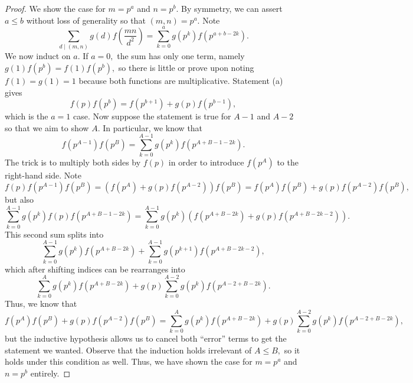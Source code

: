 \begin{proof}
We show the case for $m=p^a$ and $n=p^b.$ By symmetry, we can assert $a\le b$ without loss of generality so that $(m,n)=p^a.$ Note
\[\sum_{d\mid(m,n)}g(d)f\left(\frac{mn}{d^2}\right)=\sum_{k=0}^ag\left(p^k\right)f\left(p^{a+b-2k}\right).\]
We now induct on $a.$ If $a=0,$ the sum has only one term, namely $g(1)f\left(p^b\right)=f(1)f\left(p^b\right),$ so there is little or prove upon noting $f(1)=g(1)=1$ because both functions are multiplicative. Statement (a) gives
\[f(p)f\left(p^b\right)=f\left(p^{b+1}\right)+g(p)f\left(p^{b-1}\right),\]
which is the $a=1$ case. Now suppose the statement is true for $A-1$ and $A-2$ so that we aim to show $A.$ In particular, we know that
\[f\left(p^{A-1}\right)f\left(p^B\right)=\sum_{k=0}^{A-1}g\left(p^k\right)f\left(p^{A+B-1-2k}\right).\]
The trick is to multiply both sides by $f(p)$ in order to introduce $f\left(p^A\right)$ to the right-hand side. Note
\[f(p)f\left(p^{A-1}\right)f\left(p^B\right)=\left(f\left(p^A\right)+g(p)f\left(p^{A-2}\right)\right)f\left(p^B\right)=f\left(p^A\right)f\left(p^B\right)+g(p)f\left(p^{A-2}\right)f\left(p^B\right),\]
but also
\[\sum_{k=0}^{A-1}g\left(p^k\right)f(p)f\left(p^{A+B-1-2k}\right)=\sum_{k=0}^{A-1}g\left(p^k\right)\left(f\left(p^{A+B-2k}\right)+g(p)f\left(p^{A+B-2k-2}\right)\right).\]
This second sum splits into
\[\sum_{k=0}^{A-1}g\left(p^k\right)f\left(p^{A+B-2k}\right)+\sum_{k=0}^{A-1}g(p^{k+1})f\left(p^{A+B-2k-2}\right),\]
which after shifting indices can be rearranges into
\[\sum_{k=0}^Ag\left(p^k\right)f\left(p^{A+B-2k}\right)+g(p)\sum_{k=0}^{A-2}g(p^k)f\left(p^{A-2+B-2k}\right).\]
Thus, we know that
\[f\left(p^A\right)f\left(p^B\right)+g(p)f\left(p^{A-2}\right)f\left(p^B\right)=\sum_{k=0}^Ag\left(p^k\right)f\left(p^{A+B-2k}\right)+g(p)\sum_{k=0}^{A-2}g(p^k)f\left(p^{A-2+B-2k}\right),\]
but the inductive hypothesis allows us to cancel both ``error'' terms to get the statement we wanted. Observe that the induction holds irrelevant of $A\le B,$ so it holds under this condition as well. Thus, we have shown the case for $m=p^a$ and $n=p^b$ entirely.
\iffalse
To finish the problem, let $P$ be the largest prime dividing either $m$ or $n$ and observe that this means both $m$ and $n$ fully factor over the set of primes $p$ smaller than $P.$ In particular, let
\[m=\prod_{p_k<P}p_k^{a_k}\qquad\text{and}\qquad n=\prod_{p_k<P}p_k^{b_k},\]
where each of $\{a_k\}$ and $\{b_k\}$ may contain 0. Now using the multiplicative nature of $f,$ note
\[f(m)f(n)=f\Bigg(\prod_{p_k<P}p_k^{a_k}\Bigg)f\Bigg(\prod_{p_k<P}p_k^{b_k}\Bigg)=\prod_{p_k<P}f\left(p_k^{a_k}\right)f\left(p_k^{b_k}\right).\]
Because we have already shown the statement for prime powers, we know
\[f(m)f(n)=\prod_{p_k<P}F\left(p_k^{a_k},p_k^{b_k}\right)=F\Bigg(\prod_{p_k<P}a_k^{p_k},\prod_{p_k<P}p_k^{b_k}\Bigg)=F(m,n)\]
because $F$ is multiplicative, so we are done here.
\fi
\end{proof}

